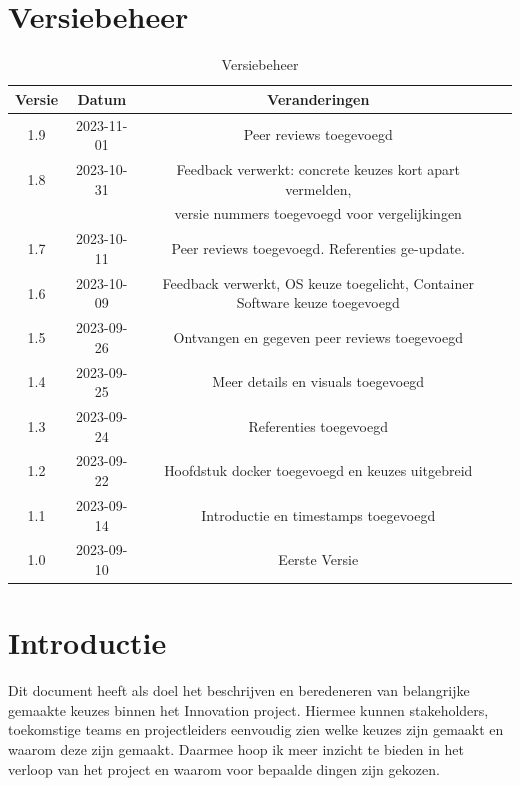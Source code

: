 \documentclass[a4paper]{report}
\begin{document}
\tableofcontents

\chapter{Versiebeheer}
\begin{table}[h]
    \centering
    \begin{tabular}{|c|c|c|p{5cm}|}
        \hline
        \textbf{Versie} & \textbf{Datum} & \textbf{Veranderingen}  \\
        \hline
        1.9   & 2023-11-01 & Peer reviews toegevoegd \\
        \hline
        1.8   & 2023-10-31 & Feedback verwerkt: concrete keuzes kort apart vermelden, \\  & & versie nummers toegevoegd voor vergelijkingen \\
        \hline
        1.7   & 2023-10-11 & Peer reviews toegevoegd. Referenties ge-update. \\
        \hline
        1.6    & 2023-10-09 & Feedback verwerkt, OS keuze toegelicht, Container Software keuze toegevoegd \\
        \hline
        1.5    & 2023-09-26 & Ontvangen en gegeven peer reviews toegevoegd \\
        \hline
        1.4    & 2023-09-25 & Meer details en visuals toegevoegd \\
        \hline
        1.3    & 2023-09-24 & Referenties toegevoegd \\
        \hline
        1.2    & 2023-09-22 & Hoofdstuk docker toegevoegd en keuzes uitgebreid \\
        \hline
        1.1    & 2023-09-14 & Introductie en timestamps toegevoegd\\
        \hline
        1.0    & 2023-09-10 & Eerste Versie \\
        \hline
    \end{tabular}
    \caption{Versiebeheer}
\end{table}


\chapter{Introductie}
Dit document heeft als doel het beschrijven en beredeneren van belangrijke gemaakte keuzes binnen het Innovation project. 
Hiermee kunnen stakeholders, toekomstige teams en projectleiders eenvoudig zien welke keuzes zijn gemaakt en waarom deze zijn gemaakt.
Daarmee hoop ik meer inzicht te bieden in het verloop van het project en waarom voor bepaalde dingen zijn gekozen. 
\vspace{1.5cm}
\end{document}
